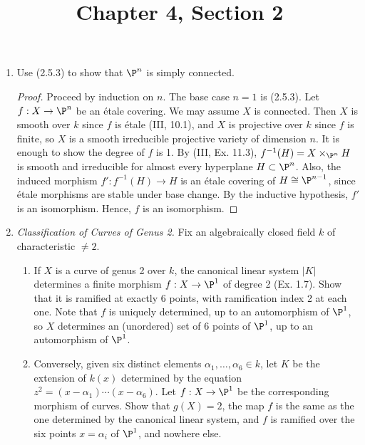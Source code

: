 \documentclass[a4paper]{article}
\title{Chapter 4, Section 2}
\begin{document}
\maketitle

\begin{enumerate} [label=\textbf{\arabic*.}, leftmargin=0em]

  \item Use (2.5.3) to show that $\P^n$ is simply connected.

        \begin{proof}
          Proceed by induction on $n$.
          The base case $n = 1$ is (2.5.3).
          Let $f : X \to \P^n$ be an étale covering.
          We may assume $X$ is connected.
          Then $X$ is smooth over $k$ since $f$ is étale (III, 10.1), and $X$ is projective over $k$ since $f$ is finite, so $X$ is a smooth irreducible projective variety of dimension $n$.
          It is enough to show the degree of $f$ is 1.
          By (III, Ex. 11.3), $f^{-1}(H) = X \times_{\P^n} H$ is smooth and irreducible for almost every hyperplane $H \subset \P^n$.
          Also, the induced morphism $f' : f^{-1}(H) \to H$ is an étale covering of $H \cong \P^{n - 1}$, since étale morphisms are stable under base change.
          By the inductive hypothesis, $f'$ is an isomorphism.
          Hence, $f$ is an isomorphism.
        \end{proof}

  \item \textit{Classification of Curves of Genus 2.} Fix an algebraically closed field $k$ of characteristic $\neq 2$.
        \begin{enumerate} [label=(\alph*)]
          \item If $X$ is a curve of genus 2 over $k$, the canonical linear system $|K|$ determines a finite morphism $f : X \to \P^1$ of degree 2 (Ex. 1.7). Show that it is ramified at exactly 6 points, with ramification index 2 at each one.
                Note that $f$ is uniquely determined, up to an automorphism of $\P^1$, so $X$ determines an (unordered) set of 6 points of $\P^1$, up to an automorphism of $\P^1$.

          \item Conversely, given six distinct elements $\alpha_1, \dots, \alpha_6 \in k$, let $K$ be the extension of $k(x)$ determined by the equation $z^2 = (x - \alpha_1) \cdots (x-\alpha_6)$.
                Let $f : X \to \P^1$ be the corresponding morphism of curves.
                Show that $g(X) = 2$, the map $f$ is the same as the one determined by the canonical linear system, and $f$ is ramified over the six points $x = \alpha_i$ of $\P^1$, and nowhere else.


\end{enumerate}
\end{enumerate}
\end{document}
